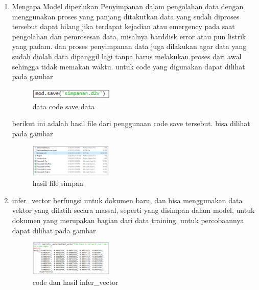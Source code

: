 \begin{enumerate}
        
        \item Mengapa Model diperlukan Penyimpanan
        \subitem dalam pengolahan data dengan menggunakan proses yang panjang ditakutkan data yang sudah diproses tersebut dapat hilang jika terdapat kejadian atau emergency pada saat pengolahan dan pemrosesan data, misalnya harddisk error atau pun listrik yang padam. dan proses penyimpanan data juga dilakukan agar data yang sudah diolah data dipanggil lagi tanpa harus melakukan proses dari awal sehingga tidak memakan waktu. untuk code yang digunakan dapat dilihat pada gambar
        
        \begin{figure}[H]
            \includegraphics[width=4cm]{figures/1174039/chapter5/26.png}
            \centering
            \caption{data code save data}
        \end{figure}
        
        berikut ini adalah hasil file dari penggunaan code save tersebut. bisa dilihat pada gambar
        \begin{figure}[H]
            \includegraphics[width=4cm]{figures/1174039/chapter5/27.png}
            \centering
            \caption{hasil file simpan}
        \end{figure}
        
        \item infer\_vector
        \subitem berfungsi untuk dokumen baru, dan  bisa menggunakan data vektor yang dilatih secara massal, seperti yang disimpan dalam model, untuk dokumen yang merupakan bagian dari data training. untuk percobaannya dapat dilihat pada gambar
        \begin{figure}[H]
            \includegraphics[width=4cm]{figures/1174039/chapter5/28.png}
            \centering
            \caption{code dan hasil infer\_vector}
        \end{figure}
        

\end{enumerate}
